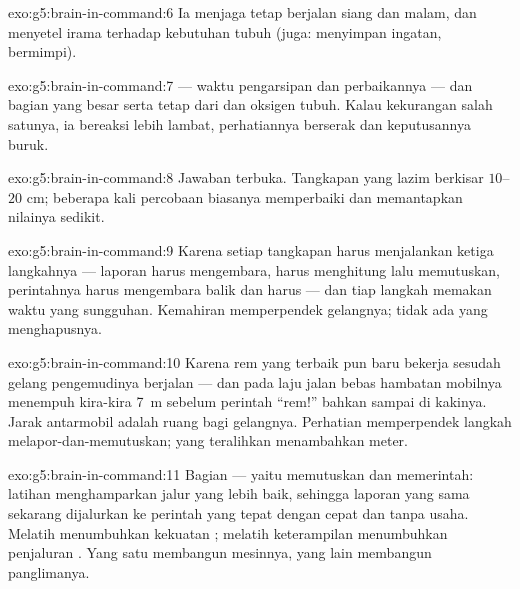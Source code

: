 \begin{solution}{exo:g5:brain-in-command:6}
Ia menjaga  tetap berjalan siang dan malam, dan menyetel
irama  terhadap kebutuhan tubuh (juga: menyimpan ingatan,
bermimpi).
\end{solution}

\begin{solution}{exo:g5:brain-in-command:7}
 --- waktu pengarsipan dan perbaikannya --- dan bagian yang besar
serta tetap dari  dan oksigen tubuh. Kalau kekurangan salah
satunya, ia bereaksi lebih lambat, perhatiannya berserak dan
keputusannya buruk.
\end{solution}

\begin{solution}{exo:g5:brain-in-command:8}
Jawaban terbuka. Tangkapan yang lazim berkisar $10$--$20$ cm;
beberapa kali percobaan biasanya memperbaiki dan memantapkan nilainya
sedikit.
\end{solution}

\begin{solution}{exo:g5:brain-in-command:9}
Karena setiap tangkapan harus menjalankan ketiga langkahnya ---
laporan  harus mengembara,  harus menghitung lalu
memutuskan, perintahnya harus mengembara balik dan  harus
 --- dan tiap langkah memakan waktu yang sungguhan.
Kemahiran memperpendek gelangnya; tidak ada yang menghapusnya.
\end{solution}

\begin{solution}{exo:g5:brain-in-command:10}
Karena rem yang terbaik pun baru bekerja sesudah gelang pengemudinya
berjalan --- dan pada laju jalan bebas hambatan mobilnya menempuh
kira-kira \qty{7}{m} sebelum perintah ``rem!'' bahkan sampai di
kakinya. Jarak antarmobil adalah ruang bagi gelangnya. Perhatian
memperpendek langkah melapor-dan-memutuskan;  yang teralihkan
menambahkan meter.
\end{solution}

\begin{solution}{exo:g5:brain-in-command:11}
Bagian  --- yaitu memutuskan dan memerintah: latihan
menghamparkan jalur yang lebih baik, sehingga laporan yang sama
sekarang dijalurkan ke perintah yang tepat dengan cepat dan tanpa
usaha. Melatih  menumbuhkan kekuatan ; melatih keterampilan
menumbuhkan penjaluran . Yang satu membangun mesinnya, yang
lain membangun panglimanya.
\end{solution}
